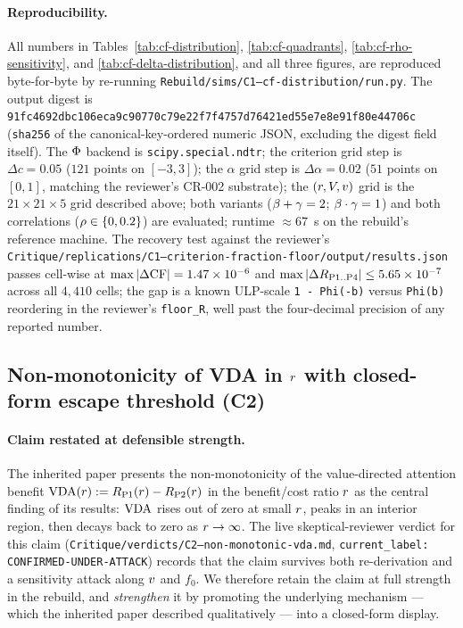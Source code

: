 \paragraph{Reproducibility.}
All numbers in Tables~\ref{tab:cf-distribution},
\ref{tab:cf-quadrants}, \ref{tab:cf-rho-sensitivity}, and
\ref{tab:cf-delta-distribution}, and all three figures, are
reproduced byte-for-byte by re-running
\texttt{Rebuild/sims/C1--cf-distribution/run.py}. The output digest
is \texttt{91fc4692dbc106eca9c90770c79e22f7f4757d76421ed55e7e8e91f80e44706c}
(\texttt{sha256} of the canonical-key-ordered numeric JSON,
excluding the digest field itself). The $\Phi$ backend is
\texttt{scipy.special.ndtr}; the criterion grid step is
$\Delta c = 0.05$ ($121$ points on $[-3, 3]$); the $\alpha$ grid
step is $\Delta \alpha = 0.02$ ($51$ points on $[0, 1]$, matching
the reviewer's CR-002 substrate); the $(r, V, v)$
grid is the $21 \times 21 \times 5$ grid described above; both
variants ($\beta + \gamma = 2$; $\beta \cdot \gamma = 1$) and
both correlations ($\rho \in \{0, 0.2\}$) are evaluated; runtime
$\approx 67$~s on the rebuild's reference machine. The recovery
test against the reviewer's
\texttt{Critique/replications/C1--criterion-fraction-floor/output/results.json}
passes cell-wise at $\max|\Delta \mathrm{CF}| = 1.47 \times 10^{-6}$ and
$\max|\Delta R_{\mathrm{P1..P4}}| \le 5.65 \times 10^{-7}$
across all $4{,}410$ cells; the gap is a known ULP-scale
\texttt{1 - Phi(-b)} versus \texttt{Phi(b)} reordering in the
reviewer's \texttt{floor\_R}, well past the four-decimal precision
of any reported number.

\subsection{Non-monotonicity of VDA in $r$ with closed-form
            escape threshold (C2)}
\label{sec:results-c2}

\paragraph{Claim restated at defensible strength.}
The inherited paper presents the non-monotonicity of the
value-directed attention benefit
$\mathrm{VDA}(r) := R_{\mathrm{P1}}(r) - R_{\mathrm{P2}}(r)$
in the benefit/cost ratio $r$ as the central finding of its
results: $\mathrm{VDA}$ rises out of zero at small $r$, peaks in an
interior region, then decays back to zero as $r \to \infty$.
The live skeptical-reviewer verdict for this claim
(\texttt{Critique/verdicts/C2--non-monotonic-vda.md},
\texttt{current\_label: CONFIRMED-UNDER-ATTACK}) records that the
claim survives both re-derivation and a sensitivity attack along
$v$ and $f_0$. We therefore retain the claim at full strength in
the rebuild, and \emph{strengthen} it by promoting the underlying
mechanism --- which the inherited paper described qualitatively ---
into a closed-form display.

